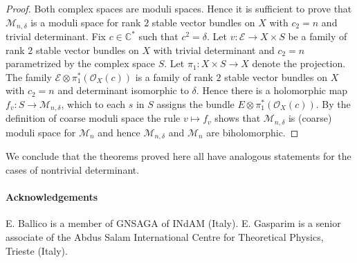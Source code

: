 \documentclass[
  a4paper, 
  reqno, 
  oneside, 
  11pt
]{amsart}
\theoremstyle{plain}	%
\theoremstyle{mydef} %
\theoremstyle{remark}
\theoremstyle{definition}
\theoremstyle{remark}
\begin{document}
\begin{proof}
Both complex spaces are moduli spaces. Hence it is sufficient to prove that $\mathcal M_{n,\delta}$ is a moduli space for rank $2$ stable vector bundles on $X$ with $c_2=n$ and trivial determinant. Fix $c\in \mathbb C^*$ such that $c^2=\delta$. Let $v\colon \mathcal E\to X\times S$ be a family of rank 2 stable vector bundles on $X$ with trivial determinant and $c_2=n$ parametrized by the complex space $S$. Let $\pi_1\colon X\times S\to X$ denote the projection. 
The family $\mathcal E\otimes \pi_1^\ast(\mathcal O_X(c))$ is a family of rank $2$ stable vector bundles on $X$ with $c_2=n$ and determinant isomorphic to $\delta$. Hence there is a holomorphic map 
$f_v\colon S\to \mathcal{M}_{n,\delta}$, which to each $s$ in 
$S$ assigns the bundle $E\otimes \pi_1^\ast(\mathcal O_X(c))$.
 By the definition of coarse moduli space the rule $v\mapsto f_v$ shows that $\mathcal{M}_{n,\delta}$ is (coarse) moduli space for $\mathcal M_n$ and hence 
$\mathcal M_{n,\delta}$ and $\mathcal M_n$ are biholomorphic.
\end{proof}

We conclude that the theorems proved here all have analogous statements 
for the cases of nontrivial determinant. \\

\paragraph{\bf Acknowledgements}  
 E. Ballico is a member of  GNSAGA of INdAM (Italy). 
 E. Gasparim is a senior associate of the Abdus Salam International 
 Centre for Theoretical Physics, Trieste (Italy).
\end{document}
